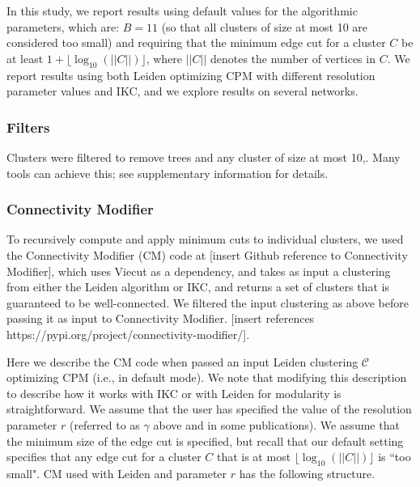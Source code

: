 \documentclass[11pt]{article}   	%
\begin{document}
In this study, we report results using default values for the algorithmic parameters, which are: $B=11$ (so that all clusters of size at most 10 are considered too small) and requiring that the minimum edge cut for a cluster $C$ be at least  $ 1+ \lfloor \log_{10}(||C||) \rfloor$,  where $||C||$ denotes the number of vertices in $C$.
We report results using both Leiden optimizing CPM with different resolution parameter values and IKC, and we explore results on several networks.


\subsubsection{Filters} Clusters were filtered to remove trees and any cluster of size at most 10,. Many tools can achieve this; see supplementary information for details.

\subsubsection{Connectivity Modifier} To recursively compute and apply minimum cuts to individual clusters, we used the Connectivity Modifier (CM) code at [insert Github reference to Connectivity Modifier], which uses Viecut \citep{Henzinger2018,Henzinger2019} as a dependency, and takes as input a clustering from either the Leiden algorithm or IKC, and returns a set of clusters that is guaranteed to be
well-connected.
We filtered the input clustering as above before passing it as input to Connectivity Modifier. [insert references https://pypi.org/project/connectivity-modifier/].

Here we describe the CM code when passed an input  Leiden clustering $\mathcal{C}$  optimizing CPM (i.e., in default mode). We note that modifying this description to describe how it works with IKC or with Leiden for modularity is straightforward.
We assume that the user has specified the value of the resolution parameter $r$ (referred to as $\gamma$ above and in some publications).
We assume that the minimum size of the edge cut is specified, but recall that our default setting specifies that any edge cut for a cluster $C$ that is at most $ \lfloor \log_{10}(||C||) \rfloor$ is ``too small".
CM used with Leiden and parameter $r$ has the following structure.
\end{document}
